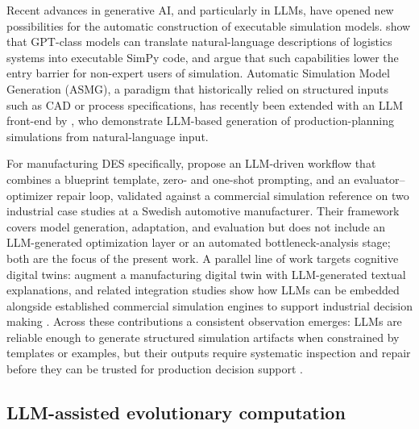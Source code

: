 \documentclass[a4paper,fleqn]{cas-sc}
\begin{document}
  Recent advances in generative AI, and particularly in LLMs, have opened new possibilities for the automatic           
  construction of executable simulation models. \citet{Jackson2024} show that GPT-class models can translate     
  natural-language descriptions of logistics systems into executable SimPy code, and \citet{Giabbanelli2024} argue that
  such capabilities lower the entry barrier for non-expert users of simulation. Automatic Simulation Model Generation
  (ASMG), a paradigm that historically relied on structured inputs such as CAD or process specifications, has recently
  been extended with an LLM front-end by \citet{Elbasheer2025}, who demonstrate LLM-based generation of              
  production-planning simulations from natural-language input.                         
                                                                                                                        
  For manufacturing DES specifically, \citet{Schmitt2026jms} propose an LLM-driven workflow that combines a blueprint   
  template, zero- and one-shot prompting, and an evaluator--optimizer repair loop, validated against a commercial       
  simulation reference on two industrial case studies at a Swedish automotive manufacturer. Their framework covers model
   generation, adaptation, and evaluation but does not include an LLM-generated optimization layer or an automated
  bottleneck-analysis stage; both are the focus of the present work. A parallel line of work targets cognitive digital
  twins: \citet{Assad2024} augment a manufacturing digital twin with LLM-generated textual explanations, and related 
  integration studies show how LLMs can be embedded alongside established commercial simulation engines to support
  industrial decision making \citep{SimGPT2026cie}. Across these contributions a consistent observation emerges: LLMs
  are reliable enough to generate structured simulation artifacts when constrained by templates or examples, but their
  outputs require systematic inspection and repair before they can be trusted for production decision support           
  \citep{Fakhoury2024,Wan2026struct}.    
  

\subsection{LLM-assisted evolutionary computation}\label{sec:related-llm-moo}                                         
                                                                                                                 
\end{document}

